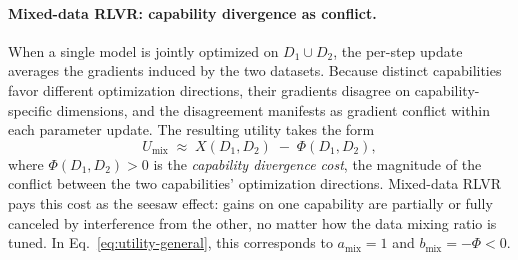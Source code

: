 \paragraph{Mixed-data RLVR: capability divergence as conflict.}
When a single model is jointly optimized on $D_1 \cup D_2$, the per-step update averages the gradients induced by the two datasets. Because distinct capabilities favor different optimization directions, their gradients disagree on capability-specific dimensions, and the disagreement manifests as gradient conflict within each parameter update. The resulting utility takes the form
\begin{equation}
U_{\text{mix}} \;\approx\; X(D_1, D_2) \;-\; \Phi(D_1, D_2),
\label{eq:utility-mix}
\end{equation}
where $\Phi(D_1, D_2) > 0$ is the \textit{capability divergence cost}, the magnitude of the conflict between the two capabilities' optimization directions. Mixed-data RLVR pays this cost as the seesaw effect: gains on one capability are partially or fully canceled by interference from the other, no matter how the data mixing ratio is tuned. In Eq.~\eqref{eq:utility-general}, this corresponds to $a_{\text{mix}} = 1$ and $b_{\text{mix}} = -\Phi < 0$.

